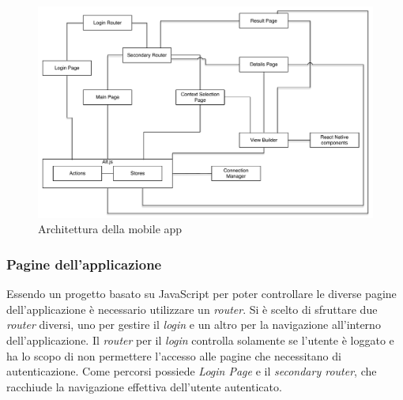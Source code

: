 \begin{figure}[h]
	\centering
	\includegraphics[width=\textwidth]{4-progettazione-alto-livello/Immagini/app_architecture.pdf}
	\caption{Architettura della mobile app}\label{fig:app-architecture}
\end{figure}

\subsubsection{Pagine dell'applicazione}

Essendo un progetto basato su JavaScript per poter controllare le diverse pagine dell'applicazione è necessario utilizzare un \emph{router}. Si è scelto di sfruttare due \emph{router} diversi, uno per gestire il \emph{login} e un altro per la navigazione all'interno dell'applicazione. Il \emph{router} per il \emph{login} controlla solamente se l'utente è loggato e ha lo scopo di non permettere l'accesso alle pagine che necessitano di autenticazione. Come percorsi possiede \emph{Login Page} e il \emph{secondary router}, che racchiude la navigazione effettiva dell'utente autenticato.

